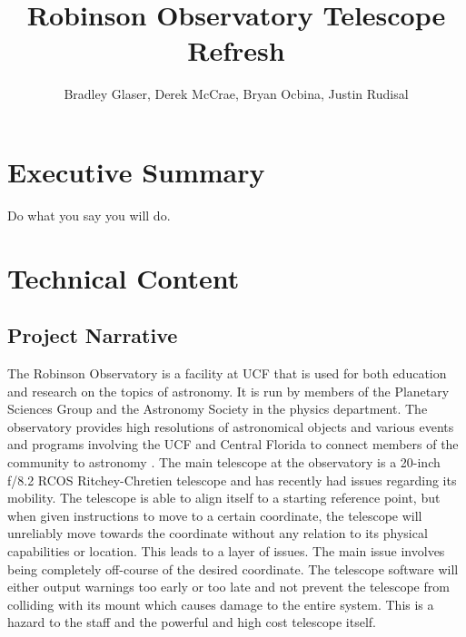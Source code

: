 \documentclass[12pt]{report}
\title{Robinson Observatory Telescope Refresh}
\author{Bradley Glaser, Derek McCrae, Bryan Ocbina, Justin Rudisal}
\begin{document}
\maketitle

\begin{abstract}
\end{abstract}

\section*{Executive Summary}
Do what you say you will do.\cite{heinrich}

\section*{Technical Content}

\subsection*{Project Narrative}

The Robinson Observatory is a facility at UCF that is used for both education and research on the topics of astronomy.  It is run by members of the Planetary Sciences Group and the Astronomy Society in the physics department.  The observatory provides high resolutions of astronomical objects and various events and programs involving the UCF and Central Florida to connect members of the community to astronomy .  The main telescope at the observatory is a 20-inch f/8.2 RCOS Ritchey-Chretien telescope and has recently had issues regarding its mobility.  The telescope is able to align itself to a starting reference point, but when given instructions to move to a certain coordinate, the telescope will unreliably move towards the coordinate without any relation to its physical capabilities or location.  This leads to a layer of issues.  The main issue involves being completely off-course of the desired coordinate.  The telescope software will either output warnings too early or too late and not prevent the telescope from colliding with its mount which causes damage to the entire system.  This is a hazard to the staff and the powerful and high cost telescope itself.
\end{document}
